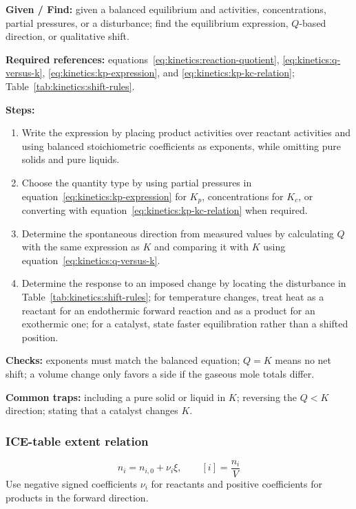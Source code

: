 \textbf{Given / Find:} given a balanced equilibrium and activities, concentrations, partial pressures, or a disturbance; find the equilibrium expression, \(Q\)-based direction, or qualitative shift.

\textbf{Required references:} equations~\eqref{eq:kinetics:reaction-quotient}, \eqref{eq:kinetics:q-versus-k}, \eqref{eq:kinetics:kp-expression}, and \eqref{eq:kinetics:kp-kc-relation}; Table~\ref{tab:kinetics:shift-rules}.

\textbf{Steps:}
\begin{enumerate}
    \item Write the expression by placing product activities over reactant activities and using balanced stoichiometric coefficients as exponents, while omitting pure solids and pure liquids.
    \item Choose the quantity type by using partial pressures in equation~\eqref{eq:kinetics:kp-expression} for \(K_p\), concentrations for \(K_c\), or converting with equation~\eqref{eq:kinetics:kp-kc-relation} when required.
    \item Determine the spontaneous direction from measured values by calculating \(Q\) with the same expression as \(K\) and comparing it with \(K\) using equation~\eqref{eq:kinetics:q-versus-k}.
    \item Determine the response to an imposed change by locating the disturbance in Table~\ref{tab:kinetics:shift-rules}; for temperature changes, treat heat as a reactant for an endothermic forward reaction and as a product for an exothermic one; for a catalyst, state faster equilibration rather than a shifted position.
\end{enumerate}

\textbf{Checks:} exponents must match the balanced equation; \(Q=K\) means no net shift; a volume change only favors a side if the gaseous mole totals differ.

\textbf{Common traps:} including a pure solid or liquid in \(K\); reversing the \(Q<K\) direction; stating that a catalyst changes \(K\).

\subsubsection{ICE-table extent relation}
\begin{equation}
n_i=n_{i,0}+\nu_i\xi, \qquad [i]=\frac{n_i}{V}
\label{eq:kinetics:ice-extent}
\end{equation}
Use negative signed coefficients \(\nu_i\) for reactants and positive coefficients for products in the forward direction.


